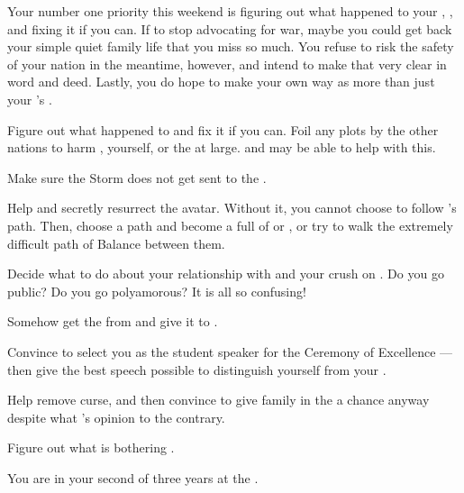 \documentclass[char]{GL2020}
\begin{document}
Your number one priority this weekend is figuring out what happened to your \cLoud{\parent}, \cLoud{}, and fixing it if you can. If \cLoud{\theywere} to stop advocating for war, maybe you could get back your simple quiet family life that you miss so much. You refuse to risk the safety of your nation in the meantime, however, and intend to make that very clear in word and deed. Lastly, you do hope to make your own way as more than just your \cLoud{\parent}'s \cWarlordDaughter{\offspring}.

\begin{itemz}
    \item Figure out what happened to \cLoud{} and fix it if you can. Foil any plots by the other nations to harm \cLoud{}, yourself, or the \pShip{} at large. \cEthics{} and \cHeir{} may be able to help with this.
    \item Make sure the Storm does not get sent to the \pShip{}.
    \item Help \cFlowPriest{} and \cEbbPriest{} secretly resurrect the \cEbb{} avatar. Without it, you cannot choose to follow \cEbb{}'s path. Then, choose a path and become a full \cWarlordDaughter{\cleric} of \cEbb{} or \cFlow{}, or try to walk the extremely difficult path of Balance between them.
    \item Decide what to do about your relationship with \cTechStar{} and your crush on \cInitiate{}. Do you go public? Do you go polyamorous? It is all so confusing!
\end{itemz}

\begin{itemz}
    \item Somehow get the \iMirror{} from \cDiplomat{} and give it to \cHeir{}.
    \item Convince \cMusic{} to select you as the student speaker for the Ceremony of Excellence — then give the best speech possible to distinguish yourself from your \cLoud{\parent}.
    \item Help \cInitiate{} remove \cInitiate{\their} curse, and then convince \cInitiate{\them} to give \cInitiate{\their} family in the \pFarm{} a chance anyway despite what \cPresident{}’s opinion to the contrary.
    \item Figure out what is bothering \cPirateChild{}.
\end{itemz}

\begin{itemz}[Notes]
    \item You are in your second of three years at the \pSchool{}.
\end{itemz}
\end{document}
